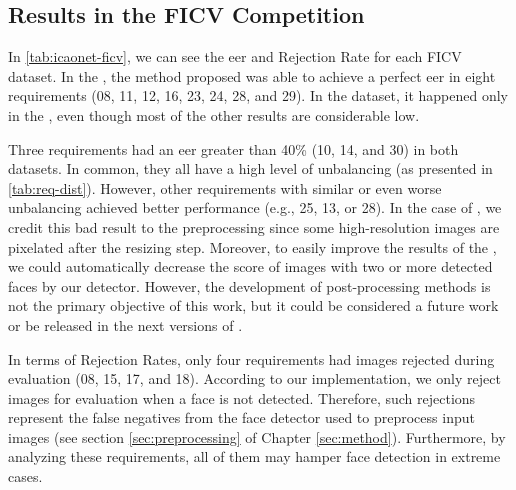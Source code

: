 

\subsection{Results in the FICV Competition} \label{sec:ficv_results}

In \autoref{tab:icaonet-ficv}, we can see the \acl{eer} and Rejection Rate for each FICV dataset. In the \ficvtest, the method proposed was able to achieve a perfect \acs{eer} in eight requirements (08, 11, 12, 16, 23, 24, 28, and 29). In the \ficvofficial dataset, it happened only in the \citeReq{\veiloverface}, even though most of the other results are considerable low. 



Three requirements had an \acs{eer} greater than 40\% (10, 14, and 30) in both datasets. In common, they all have a high level of unbalancing (as presented in \autoref{tab:req-dist}). However, other requirements with similar or even worse unbalancing achieved better performance (e.g., 25, 13, or 28). In the case of \citeReq{\pixelation}, we credit this bad result to the preprocessing since some high-resolution images are pixelated after the resizing step. Moreover, to easily improve the results of the \citeReq{\otherfacesortoys}, we could automatically decrease the score of images with two or more detected faces by our detector. However, the development of post-processing methods is not the primary objective of this work, but it could be considered a future work or be released in the next versions of \methodname.

In terms of Rejection Rates, only four requirements had images rejected during evaluation (08, 15, 17, and 18). According to our implementation, we only reject images for evaluation when a face is not detected. Therefore, such rejections represent the false negatives from the face detector used to preprocess input images (see section \ref{sec:preprocessing} of Chapter \ref{sec:method}). Furthermore, by analyzing these requirements, all of them may hamper face detection in extreme cases. 

